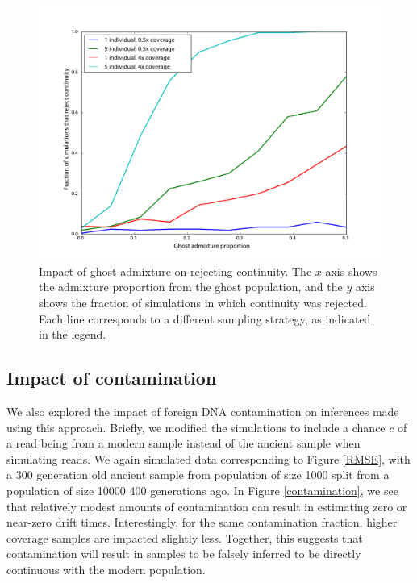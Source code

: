 \documentclass[11pt, oneside]{article}   	%
\begin{document}
\begin{figure}[h] %
   \centering
   \includegraphics[width=\textwidth]{continuity_rejection_ghost.pdf} 
   \caption{Impact of ghost admixture on rejecting continuity. The $x$ axis shows the admixture proportion from the ghost population, and the $y$ axis shows the fraction of simulations in which continuity was rejected. Each line corresponds to a different sampling strategy, as indicated in the legend.}
   \label{ghost}
\end{figure}

\subsection{Impact of contamination}

We also explored the impact of foreign DNA contamination on inferences made using this approach. Briefly, we modified the simulations to include a chance $c$ of a read being from a modern sample instead of the ancient sample when simulating reads. We again simulated data corresponding to Figure \ref{RMSE}, with a 300 generation old ancient sample from population of size 1000 split from a population of size 10000 400 generations ago. In Figure \ref{contamination}, we see that relatively modest amounts of contamination can result in estimating zero or near-zero drift times. Interestingly, for the same contamination fraction, higher coverage samples are impacted slightly less. Together, this suggests that contamination will result in samples to be falsely inferred to be directly continuous with the modern population.
\end{document}
